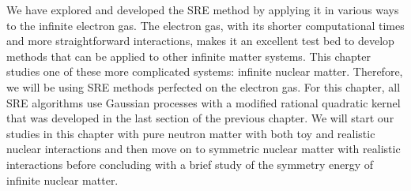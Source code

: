 

We have explored and developed the SRE method by applying it in various ways to the infinite electron gas.  The electron gas, with its shorter computational times and more straightforward interactions, makes it an excellent test bed to develop methods that can be applied to other infinite matter systems. This chapter studies one of these more complicated systems: infinite nuclear matter.  Therefore, we will be using SRE methods perfected on the electron gas. For this chapter, all SRE algorithms use Gaussian processes with a modified rational quadratic kernel that was developed in the last section of the previous chapter.  We will start our studies in this chapter with pure neutron matter with both toy and realistic nuclear interactions and then move on to symmetric nuclear matter with realistic interactions before concluding with a brief study of the symmetry energy of infinite nuclear matter.